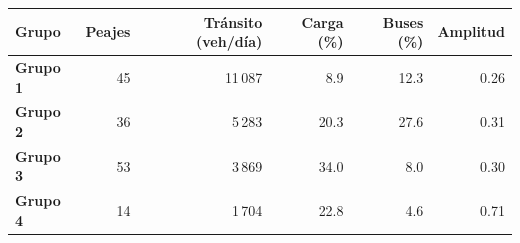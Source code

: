 \renewcommand{\arraystretch}{1.2}
\begin{tabular}{|l|r|r|r|r|r|}
\hline
\rowcolor{gray!20} \textbf{Grupo} & \textbf{Peajes} & \textbf{Tránsito (veh/día)} & \textbf{Carga (\%)} & \textbf{Buses (\%)} & \textbf{Amplitud} \\
\hline
\textbf{Grupo 1} & 45 & 11\,087 & 8.9 & 12.3 & 0.26 \\
\hline
\textbf{Grupo 2} & 36 & 5\,283 & 20.3 & 27.6 & 0.31 \\
\hline
\textbf{Grupo 3} & 53 & 3\,869 & 34.0 & 8.0 & 0.30 \\
\hline
\textbf{Grupo 4} & 14 & 1\,704 & 22.8 & 4.6 & 0.71 \\
\hline
\end{tabular}
